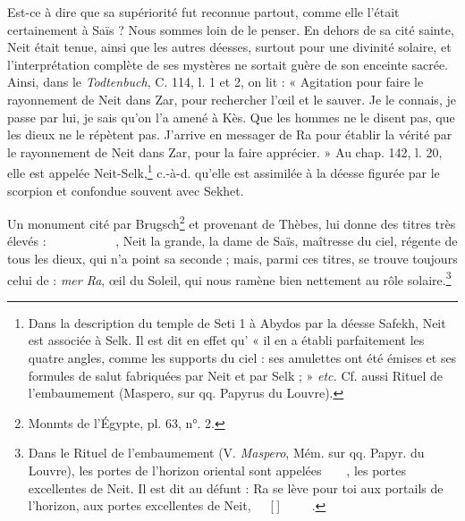\documentclass[a4paper, 11pt, oneside]{article}
\newcommand*\hieroAAAG{}
\newcommand*\hieroAAAH{}
\newcommand*\hieroAAAI{}
\newcommand*\hieroAAAM{}
\newcommand*\hieroAAAW{\raisebox{0.5ex}{}}
\newcommand*\hieroAABC{\raisebox{0.5ex}{}}
\newcommand*\hieroAABR{}
\newcommand*\hieroAACM{}
\newcommand*\hieroAACV{}
\newcommand*\hieroAADB{}
\newcommand*\hieroAADC{\raisebox{0.5ex}{}}
\newcommand*\hieroAAEF{}
\newcommand*\hieroAAEK{}
\newcommand*\hieroAAEX{}
\newcommand*\hieroAAEY{}
\newcommand*\hieroAAEZ{}
\newcommand*\hieroAAFD{}
\newcommand*\hieroAAFS{}
\newcommand*\hieroAAKG{}
\newcommand*\hieroAAMR{\raisebox{0.5ex}{}}
\newcommand*\hieroAAND{\raisebox{0.5ex}{}}
\newcommand*\hieroAANT{\raisebox{0.5ex}{}}
\newcommand*\hieroAANX{\raisebox{0.8ex}{}}
\newcommand*\hieroAAOK{}
\newcommand*\hieroAAPH{}
\newcommand*\hieroAARU{}
\newcommand*\hieroAATG{}
\newcommand*\hieroAAVG{}
\newcommand*\hieroAAWJ{}
\newcommand*\hieroAAYZ{}
\newcommand*\hieroAAZC{}
\newcommand*\hieroAAZD{}
\newcommand*\hieroAAZE{}
\newcommand*\hieroAAZF{}
\newcommand*\hieroAAZG{}
\newcommand*\hieroAAZH{}
\begin{document}
Est-ce à dire que sa supériorité fut reconnue partout, comme elle l'était certainement à Saïs ? Nous sommes loin de le penser. En dehors de sa cité sainte, Neit était tenue, ainsi que les autres déesses, surtout pour une divinité solaire, et l'interprétation complète de ses mystères ne sortait guère de son enceinte sacrée. Ainsi, dans le \emph{Todtenbuch}, C. 114, l. 1 et 2, on lit : « Agitation pour faire le rayonnement de Neit dans Zar, pour rechercher l'œil et le sauver. Je le connais, je passe par lui, je sais qu'on l’a amené à Kès. Que les hommes ne le disent pas, que les dieux ne le répètent pas. J'arrive en messager de Ra pour établir la vérité par le rayonnement de Neit dans Zar, pour la faire apprécier. » Au chap. 142, l. 20, elle est appelée Neit-Selk,\footnote{Dans la description du temple de Seti 1 à Abydos par la déesse Safekh, Neit est associée à Selk. Il est dit en effet qu' « il en a établi parfaitement les quatre angles, comme les supports du ciel : ses amulettes ont été émises et ses formules de salut fabriquées par Neit et par Selk ; » \emph{etc.} Cf. aussi Rituel de l'embaumement (Maspero, sur qq. Papyrus du Louvre).} c.-à-d. qu'elle est assimilée à la déesse figurée par le scorpion et confondue souvent avec Sekhet.

Un monument cité par Brugsch\footnote{Monmts de l'Égypte, pl. 63, n°. 2.} et provenant de Thèbes, lui donne des titres très élevés : $\hieroAACV\:\hieroAARU\:\hieroAAFS\allowbreak\:\hieroAANX\:\hieroAAAI\:\hieroAAAG\:\hieroAAAH\:\hieroAAAH\:\hieroAAAW\allowbreak\:\hieroAAFS\:\hieroAAPH\:\hieroAAEZ\:\hieroAAWJ\:\hieroAAEK\:\hieroAAEK\allowbreak\:\hieroAAEK\:\hieroAAEF\:\hieroAABC\:\hieroAACM\:\hieroAAEF\:\hieroAAMR\allowbreak\:\hieroAAND\:\hieroAAYZ\:\hieroAAAM$, Neit la grande, la dame de Saïs, maîtresse du ciel, régente de tous les dieux, qui n'a point sa seconde ; mais, parmi ces titres, se trouve toujours celui de : \emph{mer Ra}, œil du Soleil, qui nous ramène bien nettement au rôle solaire.\footnote{Dans le Rituel de l'embaumement (V. \emph{Maspero}, Mém. sur qq. Papyr. du Louvre), les portes de l'horizon oriental sont appelées $\hieroAANT\:\hieroAAAG\:\hieroAADC\allowbreak\:\hieroAAZC\:\hieroAAZD\:\hieroAABR\allowbreak\:\hieroAAEX\:\hieroAATG$, les portes excellentes de Neit. Il est dit au défunt : Ra se lève pour toi aux portails de l'horizon, aux portes excellentes de Neit, $\hieroAADC\:\hieroAAFD\:\hieroAAZE\allowbreak\:\hieroAADB\:\hieroAAOK\:\hieroAADB$[$\hieroAAVG\:\hieroAABR$]$\hieroAAZF\:\hieroAAKG\:\hieroAAZG\allowbreak\:\hieroAADB\:\hieroAABR\:\hieroAANT\allowbreak\:\hieroAAZH\:\hieroAAZC\:\hieroAAZD\allowbreak\:\hieroAABR\:\hieroAAEX\:\hieroAAEY$.}
\end{document}

